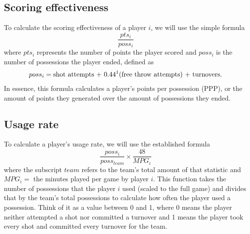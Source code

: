 \documentclass{article}
\begin{document}
\subsection*{Scoring effectiveness}
To calculate the scoring effectiveness of a player $i$, we will use the simple formula $$\frac{pts_i}{poss_i}$$
where $pts_i$ represents the number of points the player scored and $poss_i$ is the number of possessions the player ended, defined as $$ poss_i = \text{shot attempts + 0.44\footnotemark
(free throw attempts) + turnovers}.$$ In essence, this formula calculates a player's points per possession (PPP), or the amount of points they generated over the amount of possessions they ended.
\newpage\subsection*{Usage rate}
To calculate a player's usage rate, we will use the established formula
$$\frac{poss_i}{poss_{team}} \times \frac{48}{MPG_i}$$
where the subscript $team$ refers to the team's total amount of that statistic and $MPG_i=$ the minutes played per game by player $i$. This function takes the number of possessions that the player $i$ used (scaled to the full game) and divides that by the team's total possessions to calculate how often the player used a possession. Think of it as a value between 0 and 1, where 0 means the player neither attempted a shot nor committed a turnover and 1 means the player took every shot and committed every turnover for the team.
\end{document}
